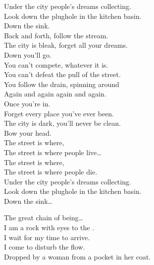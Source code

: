 Under the city people's dreams collecting. \\
Look down the plughole in the kitchen basin. \\

Down the sink. \\
Back and forth, follow the stream. \\
The city is bleak, forget all your dreams. \\
Down you'll go. \\

You can't compete, whatever it is. \\
You can't defeat the pull of the street. \\
You follow the drain, spinning around \\
Again and again again and again. \\

Once you're in. \\
Forget every place you've ever been. \\
The city is dark, you'll never be clean. \\
Bow your head. \\

The street is where, \\
The street is where people live… \\
The street is where, \\
The street is where people die. \\

Under the city people's dreams collecting. \\
Look down the plughole in the kitchen basin. \\

Down the sink… \\





The great chain of being… \\

I am a rock with eyes to the . \\
I wait for my time to arrive. \\
I come to disturb the flow. \\
Dropped by a woman from a pocket in her coat. \\

